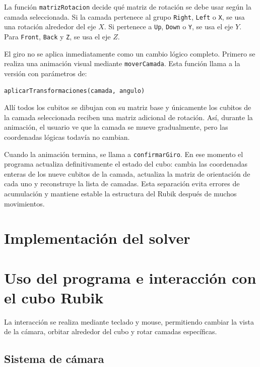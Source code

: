 \documentclass[12pt,a4paper]{article}
\begin{document}
La función \texttt{matrizRotacion} decide qué matriz de rotación se debe usar según la camada seleccionada. Si la camada pertenece al grupo \texttt{Right}, \texttt{Left} o \texttt{X}, se usa una rotación alrededor del eje $X$. Si pertenece a \texttt{Up}, \texttt{Down} o \texttt{Y}, se usa el eje $Y$. Para \texttt{Front}, \texttt{Back} y \texttt{Z}, se usa el eje $Z$.

El giro no se aplica inmediatamente como un cambio lógico completo. Primero se realiza una animación visual mediante \texttt{moverCamada}. Esta función llama a la versión con parámetros de:

\begin{center}
\texttt{aplicarTransformaciones(camada, angulo)}
\end{center}

Allí todos los cubitos se dibujan con su matriz base y únicamente los cubitos de la camada seleccionada reciben una matriz adicional de rotación. Así, durante la animación, el usuario ve que la camada se mueve gradualmente, pero las coordenadas lógicas todavía no cambian.

Cuando la animación termina, se llama a \texttt{confirmarGiro}. En ese momento el programa actualiza definitivamente el estado del cubo: cambia las coordenadas enteras de los nueve cubitos de la camada, actualiza la matriz de orientación de cada uno y reconstruye la lista de camadas. Esta separación evita errores de acumulación y mantiene estable la estructura del Rubik después de muchos movimientos.

\section{Implementación del solver}

\section{Uso del programa e interacción con el cubo Rubik}

La interacción se realiza mediante teclado y mouse, permitiendo cambiar la vista de la cámara, orbitar alrededor del cubo y rotar camadas específicas.

\subsection{Sistema de cámara}
\end{document}
